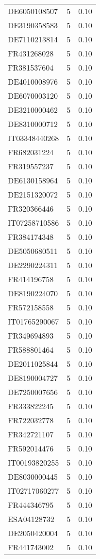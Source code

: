 \begin{table*}[htbp]
\begin{tabular}{lrr}
DE6050108507 & 5 & 0.10 \\
DE3190358583 & 5 & 0.10 \\
DE7110213814 & 5 & 0.10 \\
FR431268028 & 5 & 0.10 \\
FR381537604 & 5 & 0.10 \\
DE4010008976 & 5 & 0.10 \\
DE6070003120 & 5 & 0.10 \\
DE3210000462 & 5 & 0.10 \\
DE8310000712 & 5 & 0.10 \\
IT03348440268 & 5 & 0.10 \\
FR682031224 & 5 & 0.10 \\
FR319557237 & 5 & 0.10 \\
DE6130158964 & 5 & 0.10 \\
DE2151320072 & 5 & 0.10 \\
FR320366446 & 5 & 0.10 \\
IT07258710586 & 5 & 0.10 \\
FR384174348 & 5 & 0.10 \\
DE5050680511 & 5 & 0.10 \\
DE2290224311 & 5 & 0.10 \\
FR414196758 & 5 & 0.10 \\
DE8190224070 & 5 & 0.10 \\
FR572158558 & 5 & 0.10 \\
IT01765290067 & 5 & 0.10 \\
FR349694893 & 5 & 0.10 \\
FR588801464 & 5 & 0.10 \\
DE2011025844 & 5 & 0.10 \\
DE8190004727 & 5 & 0.10 \\
DE7250007656 & 5 & 0.10 \\
FR333822245 & 5 & 0.10 \\
FR722032778 & 5 & 0.10 \\
FR342721107 & 5 & 0.10 \\
FR592014476 & 5 & 0.10 \\
IT00193820255 & 5 & 0.10 \\
DE8030000445 & 5 & 0.10 \\
IT02717060277 & 5 & 0.10 \\
FR444346795 & 5 & 0.10 \\
ESA04128732 & 5 & 0.10 \\
DE2050420004 & 5 & 0.10 \\
FR441743002 & 5 & 0.10 \\

\end{tabular}
\end{table*}
